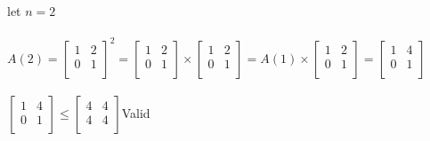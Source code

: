 \documentclass[11pt,letterpaper]{article}
\begin{document}
\begin{enumerate}[(a)]
  
  
  let $n=2$\\\\
  $A(2) = 
   \left[ {\begin{array}{cc}
   1 & 2 \\
   0 & 1 \\
  \end{array} } \right]^2
  =
  \left[ {\begin{array}{cc}
   1 & 2 \\
   0 & 1 \\
  \end{array} } \right]
  \times
  \left[ {\begin{array}{cc}
   1 & 2 \\
   0 & 1 \\
  \end{array} } \right]
  =
  A(1)\times
   \left[ {\begin{array}{cc}
   1 & 2 \\
   0 & 1 \\
  \end{array} } \right]
  =
   \left[ {\begin{array}{cc}
   1 & 4 \\
   0 & 1 \\
  \end{array} } \right]$\\\\
  
   $\left[ {\begin{array}{cc}
   1 & 4 \\
   0 & 1 \\
  \end{array} } \right]
  \leq    \left[ {\begin{array}{cc}
   4 & 4 \\
   4 & 4 \\
  \end{array} } \right]$\hfill Valid\\
  

\end{enumerate}
\end{document}

